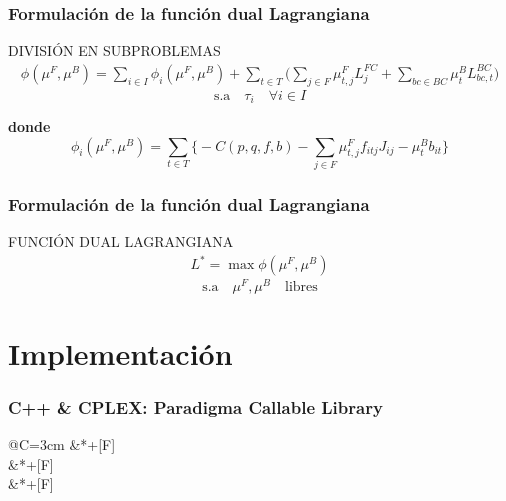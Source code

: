 \documentclass[xcolor=dvipsnames, utf8, spanish]{beamer} %
\begin{document}
\begin{frame}
	\frametitle{Formulación de la función dual Lagrangiana}
	\begingroup
		\begin{block} {DIVISIÓN EN SUBPROBLEMAS}
			\begin{align}
				\phi(\mu^F,\mu^B)= \sum_{i \in I} \phi_i (\mu^F,\mu^B)
				+ \sum_{t \in T} \Big( \sum_{j \in F} \mu^{F}_{t,j} L^{FC}_{j}+ \sum_{bc \in BC} \mu^{B}_{t} L^{BC}_{bc,t}  \Big)	
			\end{align}
			\begin{displaymath}
				\text{s.a} \quad \tau_i \quad \forall i \in I
			\end{displaymath}
		\end{block}
	\endgroup
	\textbf{donde}
	\begin{displaymath}
		\phi_i (\mu^F,\mu^B)= \sum_{t \in T} \Big\{ -C(p,q,f,b)- \sum_{j \in F} \mu_{t,j}^F  f_{itj}J_{ij} - 	\mu_{t}^{B} b_{it} \Big\}	
	\end{displaymath}
\end{frame}


\begin{frame}
	\frametitle{Formulación de la función dual Lagrangiana}
	\begingroup
		\begin{block} {FUNCIÓN DUAL LAGRANGIANA}
			\begin{align}
				L^{*}=\max \phi(\mu^F,\mu^B)	
			\end{align}
			\begin{displaymath}
				\text{s.a} \quad \mu^F,\mu^B \quad \text{libres}
			\end{displaymath}
		\end{block}
	\endgroup
\end{frame}


\section {Implementación}

\begin{frame}
	\frametitle{C++ \& CPLEX: Paradigma Callable Library}
	\begin{center}
		\xymatrix@R=1.5cm @C=3cm{
		&*+[F]  \ar[d] \\
		&*+[F]  \ar[u] \ar[d] \\
		&*+[F]  \ar[u]		
		}
	\end{center}
\end{frame}
\end{document}
